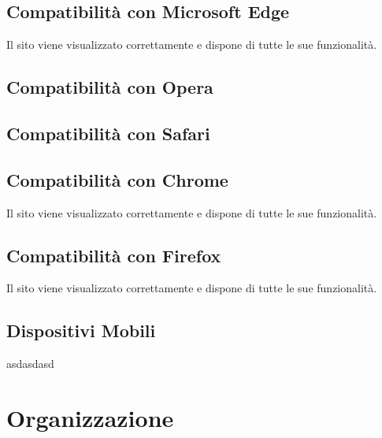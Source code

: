 \documentclass[10pt, a4paper]{article}
\begin{document}
\subsection{Compatibilità con Microsoft Edge}
Il sito viene visualizzato correttamente e dispone di tutte le sue funzionalità.

\subsection{Compatibilità con Opera}

\subsection{Compatibilità con Safari}

\subsection{Compatibilità con Chrome}
Il sito viene visualizzato correttamente e dispone di tutte le sue funzionalità.

\subsection{Compatibilità con Firefox}
Il sito viene visualizzato correttamente e dispone di tutte le sue funzionalità.

\subsection{Dispositivi Mobili}

asdasdasd
\section{Organizzazione}
\end{document}
